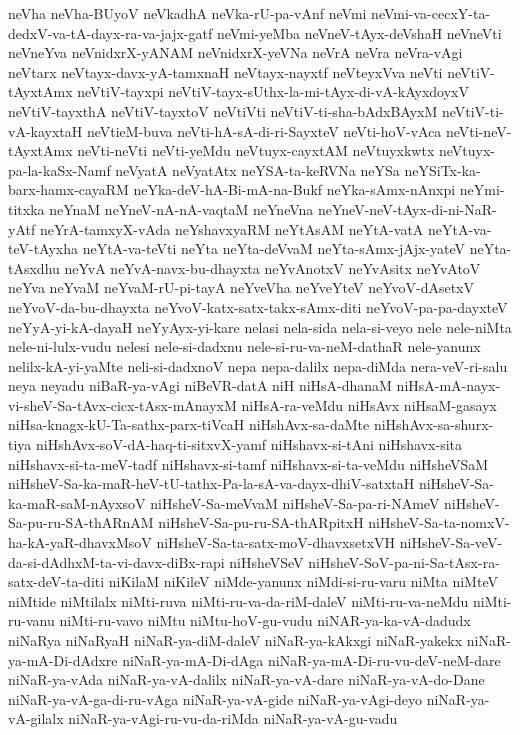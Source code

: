 {neVha
neVha-BUyoV
neVkadhA
neVka-rU-pa-vAnf
neVmi
neVmi-va-cecxY-ta-dedxV-va-tA-dayx-ra-va-jajx-gatf
neVmi-yeMba
neVneV-tAyx-deVshaH
neVneVti
neVneYva
neVnidxrX-yANAM
neVnidxrX-yeVNa
neVrA
neVra
neVra-vAgi
neVtarx
neVtayx-davx-yA-tamxnaH
neVtayx-nayxtf
neVteyxVva
neVti
neVtiV-tAyxtAmx
neVtiV-tayxpi
neVtiV-tayx-sUthx-la-mi-tAyx-di-vA-kAyxdoyxV
neVtiV-tayxthA
neVtiV-tayxtoV
neVtiVti
neVtiV-ti-sha-bAdxBAyxM
neVtiV-ti-vA-kayxtaH
neVtieM-buva
neVti-hA-sA-di-ri-SayxteV
neVti-hoV-vAca
neVti-neV-tAyxtAmx
neVti-neVti
neVti-yeMdu
neVtuyx-cayxtAM
neVtuyxkwtx
neVtuyx-pa-la-kaSx-Namf
neVyatA
neVyatAtx
neYSA-ta-keRVNa
neYSa
neYSiTx-ka-barx-hamx-cayaRM
neYka-deV-hA-Bi-mA-na-Bukf
neYka-sAmx-nAnxpi
neYmi-titxka
neYnaM
neYneV-nA-nA-vaqtaM
neYneVna
neYneV-neV-tAyx-di-ni-NaR-yAtf
neYrA-tamxyX-vAda
neYshavxyaRM
neYtAsAM
neYtA-vatA
neYtA-va-teV-tAyxha
neYtA-va-teVti
neYta
neYta-deVvaM
neYta-sAmx-jAjx-yateV
neYta-tAsxdhu
neYvA
neYvA-navx-bu-dhayxta
neYvAnotxV
neYvAsitx
neYvAtoV
neYva
neYvaM
neYvaM-rU-pi-tayA
neYveVha
neYveYteV
neYvoV-dAsetxV
neYvoV-da-bu-dhayxta
neYvoV-katx-satx-takx-sAmx-diti
neYvoV-pa-pa-dayxteV
neYyA-yi-kA-dayaH
neYyAyx-yi-kare
nelasi
nela-sida
nela-si-veyo
nele
nele-niMta
nele-ni-lulx-vudu
nelesi
nele-si-dadxnu
nele-si-ru-va-neM-dathaR
nele-yanunx
nelilx-kA-yi-yaMte
neli-si-dadxnoV
nepa
nepa-dalilx
nepa-diMda
nera-veV-ri-salu
neya
neyadu
niBaR-ya-vAgi
niBeVR-datA
niH
niHsA-dhanaM
niHsA-mA-nayx-vi-sheV-Sa-tAvx-cicx-tAsx-mAnayxM
niHsA-ra-veMdu
niHsAvx
niHsaM-gasayx
niHsa-knagx-kU-Ta-sathx-parx-tiVcaH
niHshAvx-sa-daMte
niHshAvx-sa-shurx-tiya
niHshAvx-soV-dA-haq-ti-sitxvX-yamf
niHshavx-si-tAni
niHshavx-sita
niHshavx-si-ta-meV-tadf
niHshavx-si-tamf
niHshavx-si-ta-veMdu
niHsheVSaM
niHsheV-Sa-ka-maR-heV-tU-tathx-Pa-la-sA-va-dayx-dhiV-satxtaH
niHsheV-Sa-ka-maR-saM-nAyxsoV
niHsheV-Sa-meVvaM
niHsheV-Sa-pa-ri-NAmeV
niHsheV-Sa-pu-ru-SA-thARnAM
niHsheV-Sa-pu-ru-SA-thARpitxH
niHsheV-Sa-ta-nomxV-ha-kA-yaR-dhavxMsoV
niHsheV-Sa-ta-satx-moV-dhavxsetxVH
niHsheV-Sa-veV-da-si-dAdhxM-ta-vi-davx-diBx-rapi
niHsheVSeV
niHsheV-SoV-pa-ni-Sa-tAsx-ra-satx-deV-ta-diti
niKilaM
niKileV
niMde-yanunx
niMdi-si-ru-varu
niMta
niMteV
niMtide
niMtilalx
niMti-ruva
niMti-ru-va-da-riM-daleV
niMti-ru-va-neMdu
niMti-ru-vanu
niMti-ru-vavo
niMtu
niMtu-hoV-gu-vudu
niNAR-ya-ka-vA-dadudx
niNaRya
niNaRyaH
niNaR-ya-diM-daleV
niNaR-ya-kAkxgi
niNaR-yakekx
niNaR-ya-mA-Di-dAdxre
niNaR-ya-mA-Di-dAga
niNaR-ya-mA-Di-ru-vu-deV-neM-dare
niNaR-ya-vAda
niNaR-ya-vA-dalilx
niNaR-ya-vA-dare
niNaR-ya-vA-do-Dane
niNaR-ya-vA-ga-di-ru-vAga
niNaR-ya-vA-gide
niNaR-ya-vAgi-deyo
niNaR-ya-vA-gilalx
niNaR-ya-vAgi-ru-vu-da-riMda
niNaR-ya-vA-gu-vadu
}
